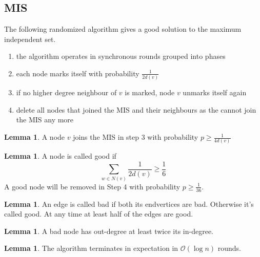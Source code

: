 \documentclass[a4paper, 12pt]{article}
\theoremstyle{plain}
\theoremstyle{definition}
\theoremstyle{lemma}
\newtheorem{lemma}[theorem]{Lemma}
\theoremstyle{remark}
\theoremstyle{corollary}
\theoremstyle{example}
\begin{document}
	\subsection{MIS}
	The following randomized algorithm gives a good solution to the maximum independent set.
	\begin{enumerate}
		\item the algorithm operates in synchronous rounds grouped into phases
		\item each node marks itself with probability $\frac{1}{2d(v)}$
		\item if no higher degree neighbour of $v$ is marked, node $v$ unmarks itself again
		\item delete all nodes that joined the MIS and their neighbours as the cannot join the MIS any more
	\end{enumerate}
	\begin{lemma}
		A node $v$ joins the MIS in step 3 with probability $p \geq \frac{1}{4d(v)}$
	\end{lemma}
	\begin{lemma}
		A node is called good if \[\sum_{w \in N(v)} \frac{1}{2d(v)} \geq \frac{1}{6}\]
		A good node will be removed in Step 4 with probability $p \geq \frac{1}{36}$.
	\end{lemma}
	\begin{lemma}
		An edge is called bad if both its endvertices are bad. Otherwise it's called good. At any time at least half of the edges are good.
	\end{lemma}
	\begin{lemma}
		A bad node has out-degree at least twice its in-degree.
	\end{lemma}
	\begin{lemma}
		The algorithm terminates in expectation in $\mathcal{O}(\log n)$ rounds.
	\end{lemma}
\end{document}
